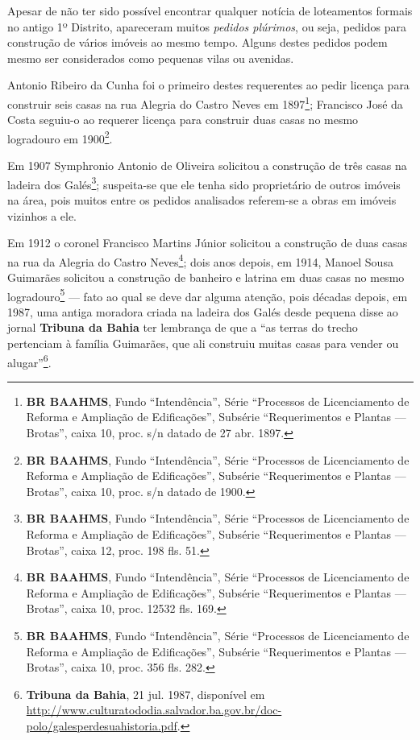 
Apesar de não ter sido possível encontrar qualquer notícia de loteamentos formais no antigo 1º Distrito, apareceram muitos \textit{pedidos plúrimos}, ou seja, pedidos para construção de vários imóveis ao mesmo tempo. Alguns destes pedidos podem mesmo ser considerados como pequenas vilas ou avenidas.


Antonio Ribeiro da Cunha foi o primeiro destes requerentes ao pedir licença para construir seis casas na rua Alegria do Castro Neves em 1897\footnote{\textbf{BR BAAHMS}, Fundo ``Intendência'', Série ``Processos de Licenciamento de Reforma e Ampliação de Edificações'', Subsérie ``Requerimentos e Plantas --- Brotas'', caixa 10, proc. s/n datado de 27 abr. 1897.}; Francisco José da Costa seguiu-o ao requerer licença para construir duas casas no mesmo logradouro em 1900\footnote{\textbf{BR BAAHMS}, Fundo ``Intendência'', Série ``Processos de Licenciamento de Reforma e Ampliação de Edificações'', Subsérie ``Requerimentos e Plantas --- Brotas'', caixa 10, proc. s/n datado de 1900.}.

Em 1907 Symphronio Antonio de Oliveira solicitou a construção de três casas na ladeira dos Galés\footnote{\textbf{BR BAAHMS}, Fundo ``Intendência'', Série ``Processos de Licenciamento de Reforma e Ampliação de Edificações'', Subsérie ``Requerimentos e Plantas --- Brotas'', caixa 12, proc. 198 fls. 51.}; suspeita-se que ele tenha sido proprietário de outros imóveis na área, pois muitos entre os pedidos analisados referem-se a obras em imóveis vizinhos a ele.

Em 1912 o coronel Francisco Martins Júnior solicitou a construção de duas casas na rua da Alegria do Castro Neves\footnote{\textbf{BR BAAHMS}, Fundo ``Intendência'', Série ``Processos de Licenciamento de Reforma e Ampliação de Edificações'', Subsérie ``Requerimentos e Plantas --- Brotas'', caixa 10, proc. 12532 fls. 169.}; dois anos depois, em 1914, Manoel Sousa Guimarães solicitou a construção de banheiro e latrina em duas casas no mesmo logradouro\footnote{\textbf{BR BAAHMS}, Fundo ``Intendência'', Série ``Processos de Licenciamento de Reforma e Ampliação de Edificações'', Subsérie ``Requerimentos e Plantas --- Brotas'', caixa 10, proc. 356 fls. 282.} --- fato ao qual se deve dar alguma atenção, pois décadas depois, em 1987, uma antiga moradora criada na ladeira dos Galés desde pequena disse ao jornal \textbf{Tribuna da Bahia} ter lembrança de que a ``as terras do trecho pertenciam à família Guimarães, que ali construiu muitas casas para vender ou alugar''\footnote{\textbf{Tribuna da Bahia}, 21 jul. 1987, disponível em \url{http://www.culturatododia.salvador.ba.gov.br/doc-polo/galesperdesuahistoria.pdf}.}.

